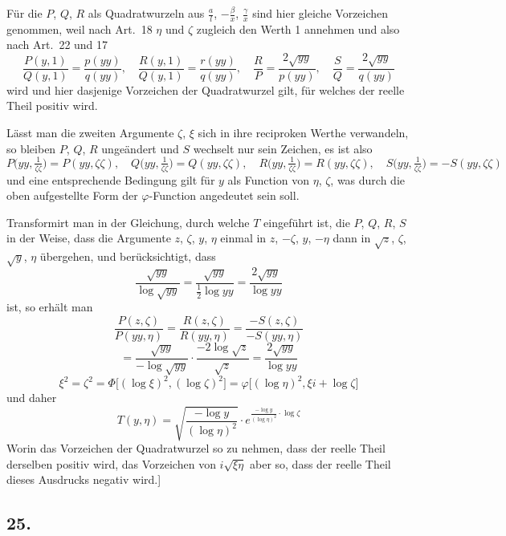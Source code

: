 \documentclass[10pt,a4paper]{article}
\begin{document}
Für die $P$, $Q$, $R$ als Quadratwurzeln aus $\frac{a}{l}$, $-\frac{\beta}{x}$, $\frac{\gamma}{x}$ sind hier gleiche Vorzeichen genommen, weil nach Art.~18 $\eta$ und $\zeta$ zugleich den Werth 1 annehmen
und also nach Art.~22 und 17
\[
\frac{P(y,1)}{Q(y,1)} = \frac{p(yy)}{q(yy)}, \quad
\frac{R(y,1)}{Q(y,1)} = \frac{r(yy)}{q(yy)}, \quad
\frac{R}{P} = \frac{2\sqrt{yy}}{p(yy)}, \quad
\frac{S}{Q} = \frac{2\sqrt{yy}}{q(yy)}
\]
wird und hier dasjenige Vorzeichen der Quadratwurzel gilt, für welches der reelle
Theil positiv wird.

Lässt man die zweiten Argumente $\zeta$, $\xi$ sich in ihre reciproken Werthe verwandeln, so bleiben $P$, $Q$, $R$ ungeändert und $S$ wechselt nur sein Zeichen, es ist also
\[
P\bigl(yy,\tfrac{1}{\zeta\zeta}\bigr)=P(yy,\zeta\zeta), \quad
Q\bigl(yy,\tfrac{1}{\zeta\zeta}\bigr)=Q(yy,\zeta\zeta), \quad
R\bigl(yy,\tfrac{1}{\zeta\zeta}\bigr)=R(yy,\zeta\zeta), \quad
S\bigl(yy,\tfrac{1}{\zeta\zeta}\bigr)=-S(yy,\zeta\zeta)
\]
und eine entsprechende Bedingung gilt für $y$ als Function von $\eta$, $\zeta$, was durch
die oben aufgestellte Form der $\varphi$-Function angedeutet sein soll.

Transformirt man in der Gleichung, durch welche $T$ eingeführt ist, die
$P$, $Q$, $R$, $S$ in der Weise, dass die Argumente $z$, $\zeta$, $y$, $\eta$ einmal in $z$, $-\zeta$, $y$, $-\eta$
dann in $\sqrt{z}$, $\zeta$, $\sqrt{y}$, $\eta$ übergehen, und berücksichtigt, dass
\[
\frac{\sqrt{yy}}{\log\sqrt{yy}} = \frac{\sqrt{yy}}{\frac12\log yy} = \frac{2\sqrt{yy}}{\log yy}
\]
ist, so erhält man
\[
\frac{P(z,\zeta)}{P(yy,\eta)} = \frac{R(z,\zeta)}{R(yy,\eta)} = \frac{-S(z,\zeta)}{-S(yy,\eta)}
\]
\[
= \frac{\sqrt{yy}}{-\log\sqrt{yy}} \cdot \frac{-2\log\sqrt{z}}{\sqrt{z}} = \frac{2\sqrt{yy}}{\log yy}
\]
\[
\xi^2 = \zeta^2 = \Phi\bigl[(\log\xi)^2,(\log\zeta)^2\bigr] = \varphi\bigl[(\log\eta)^2,\xi i+\log\zeta\bigr]
\]
und daher
\[
T(y,\eta) = \sqrt{\frac{-\log y}{(\log\eta)^2}} \cdot e^{\frac{-\log y}{(\log\eta)^2}\cdot\log\zeta}
\]
Worin das Vorzeichen der Quadratwurzel so zu nehmen, dass der reelle Theil
derselben positiv wird, das Vorzeichen von $i\sqrt{\xi\eta}$ aber so, dass der reelle Theil
dieses Ausdrucks negativ wird.]


\subsection*{25.}
\end{document}
